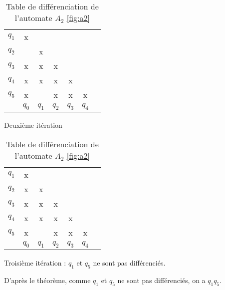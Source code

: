 \begin{example}
\begin{table}[H]
 \vspace{0.5cm}

 \begin{subtable}{.5\textwidth}
 \centering
 \begin{tabular}{ccccccc}
	 \cline{2-2}
	 \multicolumn{1}{c|}{$q_1$} & \multicolumn{1}{c|}{x} &&&&\\
	 \cline{2-3}
	 \multicolumn{1}{c|}{$q_2$} & \multicolumn{1}{c|}{} &\multicolumn{1}{c|}{x}&&&\\
	 \cline{2-4}
	 \multicolumn{1}{c|}{$q_3$} & \multicolumn{1}{c|}{x} &\multicolumn{1}{c|}{x}&\multicolumn{1}{c|}{x}&&\\
	 \cline{2-5}
	 \multicolumn{1}{c|}{$q_4$} & \multicolumn{1}{c|}{x} &\multicolumn{1}{c|}{x}&\multicolumn{1}{c|}{x}&\multicolumn{1}{c|}{x}&\\
	 \cline{2-6}
	 \multicolumn{1}{c|}{$q_5$} & \multicolumn{1}{c|}{x} & \multicolumn{1}{c|}{}&\multicolumn{1}{c|}{x}&\multicolumn{1}{c|}{x}&\multicolumn{1}{c|}{x}\\
	 \cline{2-6}
	 \multicolumn{1}{c}{} & $q_0$&$q_1$&$q_2$&$q_3$&$q_4$\\
 \end{tabular}
 \caption{Deuxième itération}
 \end{subtable}
 \begin{subtable}{.5\textwidth}
 \centering
 \begin{tabular}{ccccccc}
	 \cline{2-2}
	 \multicolumn{1}{c|}{$q_1$} & \multicolumn{1}{c|}{x} &&&&\\
	 \cline{2-3}
	 \multicolumn{1}{c|}{$q_2$} & \multicolumn{1}{c|}{x} &\multicolumn{1}{c|}{x}&&&\\
	 \cline{2-4}
	 \multicolumn{1}{c|}{$q_3$} & \multicolumn{1}{c|}{x} &\multicolumn{1}{c|}{x}&\multicolumn{1}{c|}{x}&&\\
	 \cline{2-5}
	 \multicolumn{1}{c|}{$q_4$} & \multicolumn{1}{c|}{x} &\multicolumn{1}{c|}{x}&\multicolumn{1}{c|}{x}&\multicolumn{1}{c|}{x}&\\
	 \cline{2-6}
	 \multicolumn{1}{c|}{$q_5$} & \multicolumn{1}{c|}{x} & \multicolumn{1}{c|}{}&\multicolumn{1}{c|}{x}&\multicolumn{1}{c|}{x}&\multicolumn{1}{c|}{x}\\
	 \cline{2-6}
	 \multicolumn{1}{c}{} & $q_0$&$q_1$&$q_2$&$q_3$&$q_4$\\
 \end{tabular}
 \caption{Troisième itération : $q_1$ et $q_5$ ne sont pas différenciés.}
\end{subtable}
\caption{Table de différenciation de l'automate $A_2$ \ref{fig:a2}}
\label{tab:tfaa2}
\end{table}

D'après le théorème, comme $q_1$ et $q_5$ ne sont pas différenciés, on a $q_1$\re$q_5$.

\end{example}



